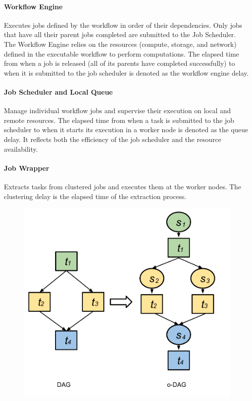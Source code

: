 \documentclass{IOS-Book-Article}
\begin{document}
\paragraph{Workflow Engine} Executes jobs defined by the workflow in order of their dependencies. Only jobs that have all their parent jobs completed are submitted to the Job Scheduler. The Workflow Engine relies on the resources (compute, storage, and network) defined in the executable workflow to perform computations. The elapsed time from when a job is released (all of its parents have completed successfully) to when it is submitted to the job scheduler is denoted as the workflow engine delay. %

\paragraph{Job Scheduler and Local Queue} Manage individual workflow jobs and supervise their execution on local and remote resources. The elapsed time from when a task is submitted to the job scheduler to when it starts its execution in a worker node is denoted as the queue delay. It reflects both the efficiency of the job scheduler and the resource availability. 

\paragraph{Job Wrapper} Extracts tasks from clustered jobs and executes them at the worker nodes. The clustering delay is the  elapsed time of the extraction process.

\begin{figure}[!htb]
	\centering
	\includegraphics[width=0.6\linewidth]{odag.pdf}
	\label{fig:model_odag}
\end{figure}
\end{document}
